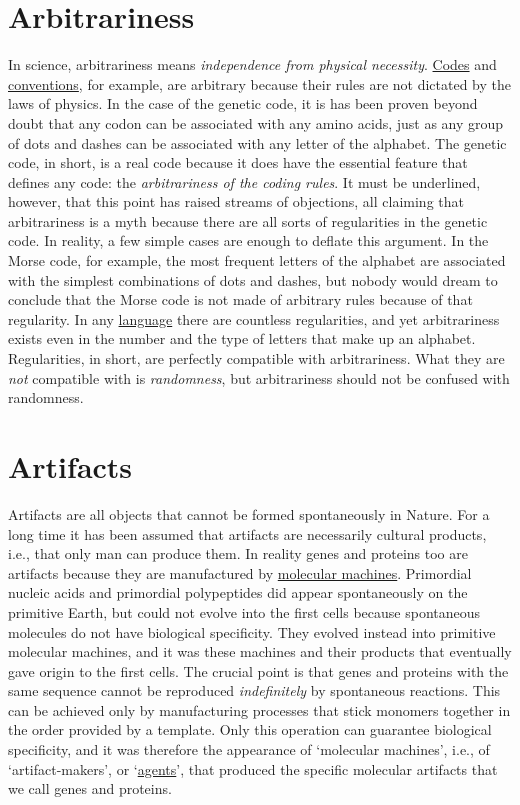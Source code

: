 \documentclass[12pt]{article}
\begin{document}
\section{Arbitrariness}
In science, arbitrariness means \textit{independence from physical necessity}. \hyperlink{code}{Codes} and \hyperlink{convention}{conventions}, for example, are arbitrary because their rules are not dictated by the laws of physics. In the case of the genetic code, it is has been proven beyond doubt that any codon can be associated with any amino acids, just as any group of dots and dashes can be associated with any letter of the alphabet. The genetic code, in short, is a real code because it does have the essential feature that defines any code: the \textit{arbitrariness of the coding rules}. It must be underlined, however, that this point has raised streams of objections, all claiming that arbitrariness is a myth because there are all sorts of regularities in the genetic code. In reality, a few simple cases are enough to deflate this argument. In the Morse code, for example, the most frequent letters of the alphabet are associated with the simplest combinations of dots and dashes, but nobody would dream to conclude that the Morse code is not made of arbitrary rules because of that regularity. In any \hyperlink{language}{language} there are countless regularities, and yet arbitrariness exists even in the number and the type of letters that make up an alphabet. Regularities, in short, are perfectly compatible with arbitrariness. What they are \textit{not} compatible with is \textit{randomness}, but arbitrariness should not be confused with randomness.


\hypertarget{artifacts}{}
\section{Artifacts}
Artifacts are all objects that cannot be formed spontaneously in Nature. For a long time it has been assumed that artifacts are necessarily cultural products, i.e., that only man can produce them. In reality genes and proteins too are artifacts because they are manufactured by \hyperlink{molecular_machines}{molecular machines}. Primordial nucleic acids and primordial polypeptides did appear spontaneously on the primitive Earth, but could not evolve into the first cells because spontaneous molecules do not have biological specificity. They evolved instead into primitive molecular machines, and it was these machines and their products that eventually gave origin to the first cells. The crucial point is that genes and proteins with the same sequence cannot be reproduced \textit{indefinitely} by spontaneous reactions. This can be achieved only by manufacturing processes that stick monomers together in the order provided by a template. Only this operation can guarantee biological specificity, and it was therefore the appearance of `molecular machines', i.e., of `artifact-makers', or `\hyperlink{agent}{agents}', that produced the specific molecular artifacts that we call genes and proteins. 
\end{document}
